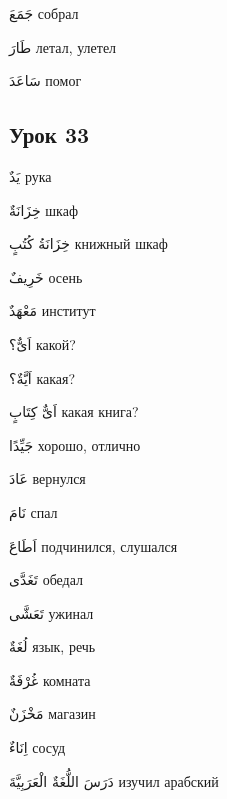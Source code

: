\documentclass[a5paper]{article}
\newcommand\textstyleDropCaps[1]{#1}
\newcommand\textstyleCaptioncharacters[1]{#1}
\begin{document}
\textstyleCaptioncharacters{جَمَعَ }\textstyleDropCaps{собрал‎}

\textstyleCaptioncharacters{طَارَ }\textstyleDropCaps{летал, улетел‎}

\textstyleCaptioncharacters{سَاعَدَ }\textstyleDropCaps{помог‎}

\subsection[Урок 33‎]{\textstyleDropCaps{Урок 33‎}}
\textstyleCaptioncharacters{يَدٌ }\textstyleDropCaps{рука‎}

\textstyleCaptioncharacters{خِزَانَةٌ }\textstyleDropCaps{шкаф‎}

\textstyleCaptioncharacters{خِزَانَةُ كُتُبٍ }\textstyleDropCaps{книжный шкаф‎}

\textstyleCaptioncharacters{خَرِيفٌ }\textstyleDropCaps{осень‎}

\textstyleCaptioncharacters{مَعْهَدٌ }\textstyleDropCaps{институт‎}

\textstyleCaptioncharacters{اَىٌّ؟ }\textstyleDropCaps{какой?‎}

\textstyleCaptioncharacters{اَيَّةٌ؟ }\textstyleDropCaps{какая?‎}

\textstyleCaptioncharacters{اَىٌّ كِتَابٍ }\textstyleDropCaps{какая книга?‎}

\textstyleCaptioncharacters{جَيِّدًا }\textstyleDropCaps{хорошо, отлично‎}

\textstyleCaptioncharacters{عَادَ }\textstyleDropCaps{вернулся‎}

\textstyleCaptioncharacters{نَامَ }\textstyleDropCaps{спал‎}

\textstyleCaptioncharacters{اَطَاعَ }\textstyleDropCaps{подчинился, слушал­ся‎}

\textstyleCaptioncharacters{تَغَدَّى }\textstyleDropCaps{обедал‎}

\textstyleCaptioncharacters{تَعَشَّى }\textstyleDropCaps{ужинал‎}

\textstyleCaptioncharacters{لُغَةٌ }\textstyleDropCaps{язык, речь‎}

\textstyleCaptioncharacters{غُرْفَةٌ }\textstyleDropCaps{комната‎}

\textstyleCaptioncharacters{مَخْزَنٌ }\textstyleDropCaps{магазин‎}

\textstyleCaptioncharacters{اِنَاءٌ }\textstyleDropCaps{сосуд‎}

\textstyleCaptioncharacters{دَرَسَ اللُّغَةٌ الْعَرَبِيَّةَ }\textstyleDropCaps{изучил арабский ‎}
\end{document}
